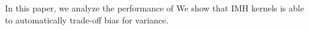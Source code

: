 
In this paper, we analyze the performance of 
We show that IMH kernels is able to automatically trade-off bias for variance.

